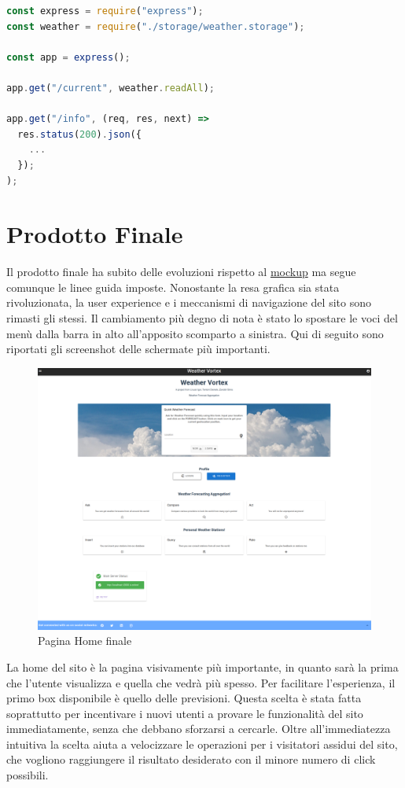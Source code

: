 \begin{lstlisting}[language=Javascript]
const express = require("express");
const weather = require("./storage/weather.storage");

const app = express();

app.get("/current", weather.readAll);

app.get("/info", (req, res, next) =>
  res.status(200).json({
    ...
  });
);
\end{lstlisting}

\section{Prodotto Finale}
\label{prodottofinale}
Il prodotto finale ha subito delle evoluzioni rispetto al \href{https://github.com/Weather-Vortex/WeatherVortex-Report/raw/main/MockUps/WeatherVortex-Mockup.pdf}{mockup} ma segue comunque le linee
guida imposte. Nonostante la resa grafica sia stata rivoluzionata, la user experience e i meccanismi di navigazione del sito sono rimasti gli stessi.  Il cambiamento più degno di nota è stato lo spostare le voci del menù dalla barra in alto all'apposito scomparto a sinistra. Qui di seguito sono riportati gli screenshot delle schermate più importanti.

\begin{figure}[H]
    \caption{Pagina Home finale}
    \label{fig:imHome}
    \centering
    \includegraphics[width=1\textwidth]{Images/homepage.PNG}
\end{figure}
La home del sito è la pagina visivamente più importante, in quanto sarà la prima che l'utente visualizza e quella che vedrà più spesso. Per facilitare l'esperienza, il primo box disponibile è quello delle previsioni. Questa scelta è stata fatta soprattutto per incentivare i nuovi utenti a provare le funzionalità del sito immediatamente, senza che debbano sforzarsi a cercarle. Oltre all'immediatezza intuitiva la scelta aiuta a velocizzare le operazioni per i visitatori assidui del sito, che vogliono raggiungere il risultato desiderato con il minore numero di click possibili.

